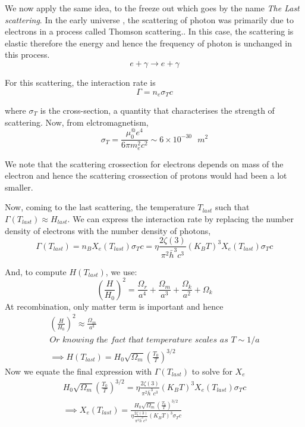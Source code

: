 \documentclass[12pt]{report}
\newcommand{\tit}[1]{\textit{#1}}
\begin{document}
We now apply the same idea, to the freeze out which goes by the name \tit{The Last scattering}. In the early universe , the scattering of photon was primarily due to electrons in a process called Thomson scattering.. In this case, the scattering is elastic therefore the energy and hence the frequency of photon is unchanged in this process.
\begin{equation}
e+\gamma \rightarrow e+\gamma
\end{equation}

For this scattering, the interaction rate is 
\begin{equation}
\Gamma=n_e \sigma_Tc
\end{equation}

where $\sigma_T$ is the cross-section, a quantity that characterises the strength of scattering. Now, from elctromagnetism,
\begin{equation}
\sigma_T=\frac{\mu_0^@ e^4}{6 \pi m_e^2 c^2} \sim 6 \times 10^{-30} \tit{ } m^2
\end{equation}

We note that the scattering crossection for electrons depends on mass of the electron and hence the scattering crossection of protons would had been a lot smaller.

Now, coming to the last scattering, the temperature $T_{last}$ such that $\Gamma(T_{last}) \approx H_{last}$. We can express the interaction rate by replacing the number density of electrons with the number density of photons,
\begin{equation}
\Gamma(T_{last})=n_B X_e(T_{last})\sigma_Tc=\eta\frac{2\zeta(3)}{\pi^2 \bar{h}^3 c^3}(K_BT)^3  X_e(T_{last})\sigma_Tc 
\end{equation}

And, to compute $H(T_{last})$, we use:
\begin{equation}
\left(\frac{H}{H_0}\right)^2= \frac{\Omega_r}{a^4}+\frac{\Omega_m}{a^3}+\frac{\Omega_k}{a^2}+\Omega_k
\end{equation}
At recombination, only matter term is important and hence
\begin{eqnarray*}
\left(\frac{H}{H_0}\right)^2 \approx \frac{\Omega_m}{a^3}\\
\tit{Or knowing the fact that temperature scales as $T \sim 1/a$}\\
\implies H(T_{last})=H_0 \sqrt{\Omega_m}\left(\frac{T_0}{T}\right)^{3/2}
\end{eqnarray*}
Now we equate the final expression with $\Gamma(T	_{last})$ to solve for $X_e$
\begin{eqnarray*}
H_0 \sqrt{\Omega_m}\left(\frac{T_0}{T}\right)^{3/2}=\eta\frac{2\zeta(3)}{\pi^2 \bar{h}^3 c^3}(K_BT)^3  X_e(T_{last})\sigma_Tc\\
\implies X_e(T_{last})=\frac{H_0 \sqrt{\Omega_m}\left(\frac{T_0}{T}\right)^{3/2}}{\eta\frac{2\zeta(3)}{\pi^2 \bar{h}^3 c^3}(K_BT)^3  \sigma_Tc}\\
\end{eqnarray*}
\end{document}
